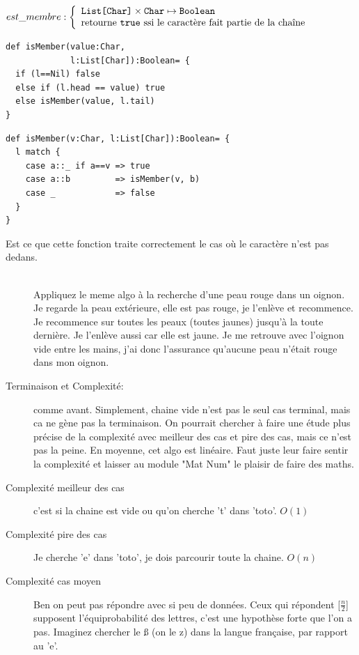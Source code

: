 \documentclass[10pt]{article}\usepackage[correction,nu]{esial}
\begin{document}
\begin{Question}
  $est\_membre: \left\{
    \begin{array}{l}
      \text{\texttt{List[Char]}}\times \text{\texttt{Char}}\mapsto \text{\texttt{Boolean}}\\
      \text{retourne \text{\texttt{true}} ssi le caractère fait partie de la chaîne}
    \end{array}\right.$  
\end{Question}
\begin{Reponse}
\noindent
  \begin{minipage}{.43\linewidth}
  \begin{Verbatim}
def isMember(value:Char,
             l:List[Char]):Boolean= {
  if (l==Nil) false
  else if (l.head == value) true
  else isMember(value, l.tail)
}

  \end{Verbatim}    
  \end{minipage}
  \begin{minipage}{.55\linewidth}
  \begin{Verbatim}[numbers=right]
def isMember(v:Char, l:List[Char]):Boolean= {
  l match {
    case a::_ if a==v => true
    case a::b         => isMember(v, b)
    case _            => false
  }
}
  \end{Verbatim}        
  \end{minipage}

  \begin{description}
  \item[Est ce que cette fonction traite correctement le cas où le caractère
    n'est pas dedans.] ~\\ Appliquez le meme algo à la recherche d'une peau
    rouge dans un oignon. Je regarde la peau extérieure, elle est pas rouge, je
    l'enlève et recommence. Je recommence sur toutes les peaux (toutes jaunes)
    jusqu'à la toute dernière. Je l'enlève aussi car elle est jaune. Je me
    retrouve avec l'oignon vide entre les mains, j'ai donc l'assurance qu'aucune
    peau n'était rouge dans mon oignon.
  \item[Terminaison et Complexité:] comme avant. Simplement, chaine vide n'est
    pas le seul cas terminal, mais ca ne gène pas la terminaison. On pourrait
    chercher à faire une étude plus précise de la complexité avec meilleur des
    cas et pire des cas, mais ce n'est pas la peine. En moyenne, cet algo est
    linéaire. Faut juste leur faire sentir la complexité et laisser au module
    "Mat Num" le plaisir de faire des maths.
  \item[Complexité meilleur des cas] c'est si la chaine est vide ou qu'on
    cherche 't' dans 'toto'. $O(1)$
  \item[Complexité pire des cas] Je cherche 'e' dans 'toto', je dois parcourir
    toute la chaine. $O(n)$
  \item[Complexité cas moyen] Ben on peut pas répondre avec si peu de
    données. Ceux qui répondent [$\frac{n}{2}$] supposent l'équiprobabilité des
    lettres, c'est une hypothèse forte que l'on a pas. Imaginez chercher le ß
    (on le z) dans la langue française, par rapport au 'e'.
  \end{description}
\end{Reponse}
\end{document}
